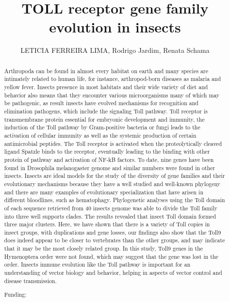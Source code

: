 \documentclass[twoside]{article}
\title{\vspace{-15mm}\fontsize{24pt}{10pt}\selectfont\textbf{ TOLL receptor gene family evolution in insects }} %
\author{ LETICIA FERREIRA LIMA, Rodrigo Jardim, Renata Schama }
\affil{ Laborat\'orio de Biologia Computacional e Sistemas,  Oswaldo Cruz Institute- Fiocruz }
\date{}
\begin{document}
  
  
  \maketitle %
  
  
  \thispagestyle{fancy} %
  
  
  \begin{abstract}
  Arthropoda can be found in almost every habitat on earth and many species are intimately related to human life,  for instance,  arthropod-born diseases as malaria and yellow fever. Insects presence in most habitats and their wide variety of diet and behavior also means that they encounter various microorganisms many of which may be pathogenic,  as result insects have evolved mechanisms for recognition and elimination pathogens,  which include the signaling Toll pathway. Toll receptor is transmembrane protein essential for embryonic development and immunity,  the induction of the Toll pathway by Gram-positive bacteria or fungi leads to the activation of cellular immunity as well as the systemic production of certain antimicrobial peptides. The Toll receptor is activated when the proteolytically cleaved ligand Spatzle binds to the receptor,  eventually leading to the binding with other protein of pathway and activation of NF-kB factors. To date,  nine genes have been found in Drosophila melanogaster genome and similar numbers were found in other insects. Insects are ideal models for the study of the diversity of gene families and their evolutionary mechanisms because they have a well studied and well-known phylogeny and there are many examples of evolutionary specialization that have arisen in different bloodlines,  such as hematophagy.  Phylogenetic analyses using the Toll domain of each sequence retrieved from 40 insects genome was able to divide the Toll family into three well supports clades. The results revealed that insect Toll domain formed three major clusters. Here,  we have shown that there is a variety of Toll copies in insect groups,  with duplications and gene losses,  our findings also show that the Toll9 does indeed appear to be closer to vertebrates than the other groups,  and may indicate that it may be the most closely related group. In this study,  Toll9 genes in the Hymenoptera order were not found,  which may suggest that the gene was lost in the order. Insects immune evolution like the Toll pathway is important for an understanding of vector biology and behavior,  helping in aspects of vector control and disease transmission.
  
  Funding:  \\ 
  \end{abstract}
  
\end{document}
